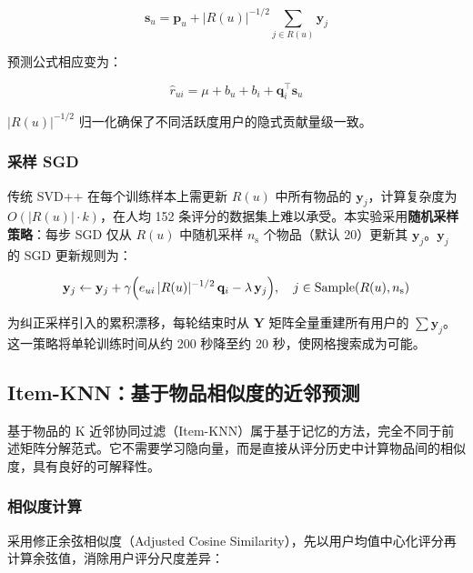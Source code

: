 \documentclass[UTF8,a4paper,10pt]{ctexart}
\begin{document}
\begin{equation}
    \mathbf{s}_u = \mathbf{p}_u + |R(u)|^{-1/2} \sum_{j \in R(u)} \mathbf{y}_j
    \label{eq:svdpp_su}
\end{equation}

预测公式相应变为：

\begin{equation}
    \hat{r}_{ui} = \mu + b_u + b_i + \mathbf{q}_i^{\!\top} \mathbf{s}_u
    \label{eq:svdpp}
\end{equation}

$|R(u)|^{-1/2}$ 归一化确保了不同活跃度用户的隐式贡献量级一致。

\subsubsection{采样 SGD}

传统 SVD++ 在每个训练样本上需更新 $R(u)$ 中所有物品的 $\mathbf{y}_j$，计算复杂度为 $O(|R(u)| \cdot k)$，在人均 152 条评分的数据集上难以承受。本实验采用\textbf{随机采样策略}：每步 SGD 仅从 $R(u)$ 中随机采样 $n_{\text{s}}$ 个物品（默认 20）更新其 $\mathbf{y}_j$。$\mathbf{y}_j$ 的 SGD 更新规则为：

\begin{equation}
    \mathbf{y}_j \leftarrow \mathbf{y}_j
    + \gamma\Bigl(e_{ui}\,|R(u)|^{-1/2}\,\mathbf{q}_i - \lambda\,\mathbf{y}_j\Bigr),
    \quad j \in \text{Sample}(R(u), n_{\text{s}})
    \label{eq:svdpp_y}
\end{equation}

为纠正采样引入的累积漂移，每轮结束时从 $\mathbf{Y}$ 矩阵全量重建所有用户的 $\sum\mathbf{y}_j$。这一策略将单轮训练时间从约 200 秒降至约 20 秒，使网格搜索成为可能。

\subsection{Item-KNN：基于物品相似度的近邻预测}

基于物品的 K 近邻协同过滤（Item-KNN）属于基于记忆的方法\cite{sarwar2001itembased}，完全不同于前述矩阵分解范式。它不需要学习隐向量，而是直接从评分历史中计算物品间的相似度，具有良好的可解释性。

\subsubsection{相似度计算}

采用修正余弦相似度（Adjusted Cosine Similarity），先以用户均值中心化评分再计算余弦值，消除用户评分尺度差异：
\end{document}
